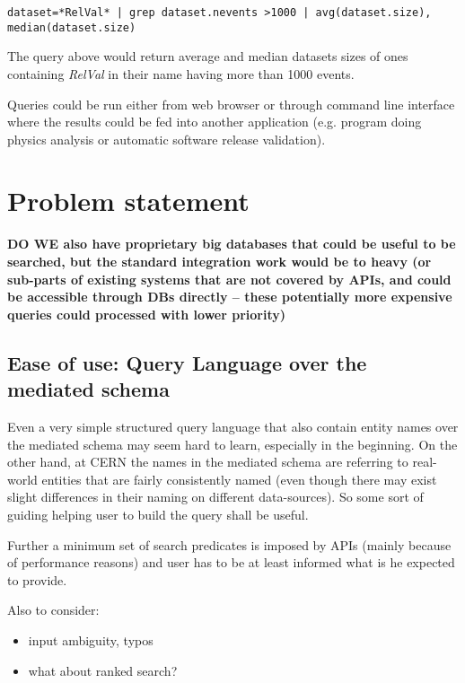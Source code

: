 \documentclass[a4paper,11pt,draft]{article}
\begin{document}
{\footnotesize 
\begin{verbatim}
dataset=*RelVal* | grep dataset.nevents >1000 | avg(dataset.size), median(dataset.size)
\end{verbatim}
}

The query above would return average and median datasets sizes  of ones containing  \textit{RelVal} in their name having more than 1000 events.

Queries could be run either from web browser or through  command line interface where the results could  be fed into another application (e.g. program doing physics analysis or automatic software release validation).



\section{Problem statement}

\textbf{\color{red}DO WE also have proprietary big databases that could be useful to be searched, but the standard integration work would be to heavy (or sub-parts of existing systems that are not covered by APIs, and could be accessible through DBs directly -- these potentially more expensive queries could processed with lower priority)}

\subsection{Ease of use: Query Language over the mediated schema}
	Even a very simple structured query language that also contain entity names over the mediated schema may seem {\color{red}hard} to learn, especially in the beginning.
   On the other hand, at CERN the names in  the mediated schema are referring to real-world entities that {\color{red}are fairly consistently named} (even though there may exist slight differences in their naming on different data-sources). 
   So some sort of guiding helping user to build the query shall be useful.
        
	Further a minimum set of search predicates is imposed by APIs (mainly because of performance reasons) and user has to be at least informed what is he expected to provide.
                
                
Also to consider:
\begin{itemize}         
       \item input ambiguity, typos
       \item {\color{red} what about ranked search?}
\end{itemize}
\end{document}
